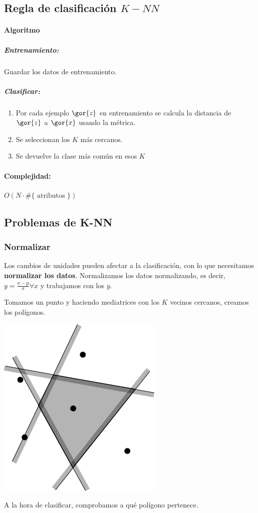 \documentclass{apuntes}
\begin{document}
\subsection{Regla de clasificación $K-NN$}

\paragraph{Algoritmo}
\subparagraph*{Entrenamiento:} Guardar los datos de entrenamiento.
\subparagraph*{Clasificar:} 
\begin{enumerate}
	\item Por cada ejemplo $\gor{z}$ en entrenamiento se calcula la distancia de $\gor{z}$ a $\gor{x}$ usando la métrica.
	\item Se seleccionan los $K$ más cercanos.
	\item Se devuelve la clase más común en esos $K$
\end{enumerate}
\paragraph{Complejidad: } $O(N·\#\{\text{ atributos }\})$

\subsection{Problemas de K-NN}

\subsubsection{Normalizar}
Los cambios de unidades pueden afectar a la clasificación, con lo que necesitamos \textbf{normalizar los datos}. Normalizamos los datos normalizando, es decir, $ y = \frac{x - µ}{σ} ∀x$ y trabajamos con los $y$.


\begin{defn}
Tomamos un punto y haciendo mediatrices con los $K$ vecinos cercanos, creamos los polígonos.
\begin{center}
\includegraphics[scale=0.5]{img/Voronoi_cell.png}
\end{center}

A la hora de clasificar, comprobamos a qué polígono pertenece.
\end{defn}
\end{document}
